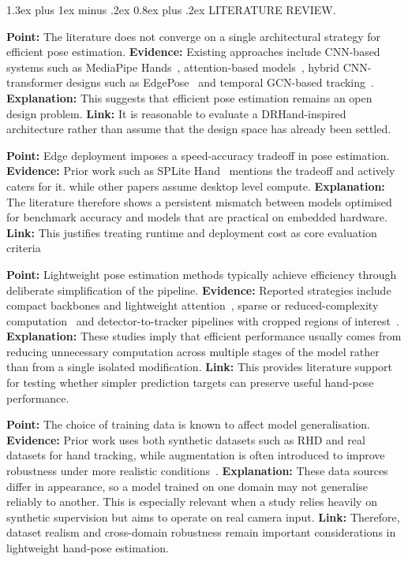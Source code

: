 \documentclass[10pt,letterpaper]{article}
\makeatletter
\renewcommand\section{\@startsection{section}{1}{\z@}%
  {1.3ex plus 1ex minus .2ex}%
  {0.8ex plus .2ex}%
  {\centering\normalfont\small\scshape}}
\makeatother
\begin{document}
\section{LITERATURE REVIEW}.

\medskip
\noindent\textbf{Point:} The literature does not converge on a single architectural strategy for efficient pose estimation.  
\textbf{Evidence:} Existing approaches include CNN-based systems such as MediaPipe Hands~\cite{mediapipe}, attention-based models~\cite{attentionlite}, hybrid CNN-transformer designs such as EdgePose~\cite{edgepose} and temporal GCN-based tracking~\cite{handobjectgcn}.  
\textbf{Explanation:} This suggests that efficient pose estimation remains an open design problem.  
\textbf{Link:} It is reasonable to evaluate a DRHand-inspired architecture rather than assume that the design space has already been settled.

\medskip
\noindent\textbf{Point:} Edge deployment imposes a speed-accuracy tradeoff in pose estimation.  
\textbf{Evidence:} Prior work such as SPLite Hand~\cite{splitehand} mentions the tradeoff and actively caters for it. while other papers assume desktop level compute.
\textbf{Explanation:} The literature therefore shows a persistent mismatch between models optimised for benchmark accuracy and models that are practical on embedded hardware.  
\textbf{Link:} This justifies treating runtime and deployment cost as core evaluation criteria

\medskip
\noindent\textbf{Point:} Lightweight pose estimation methods typically achieve efficiency through deliberate simplification of the pipeline.  
\textbf{Evidence:} Reported strategies include compact backbones and lightweight attention~\cite{attentionlite}, sparse or reduced-complexity computation~\cite{splitehand} and detector-to-tracker pipelines with cropped regions of interest~\cite{mediapipe}.  
\textbf{Explanation:} These studies imply that efficient performance usually comes from reducing unnecessary computation across multiple stages of the model rather than from a single isolated modification.  
\textbf{Link:} This provides literature support for testing whether simpler prediction targets can preserve useful hand-pose performance.

\medskip
\noindent\textbf{Point:} The choice of training data is known to affect model generalisation.  
\textbf{Evidence:} Prior work uses both synthetic datasets such as RHD and real datasets for hand tracking, while augmentation is often introduced to improve robustness under more realistic conditions~\cite{handobjectgcn,lightweightgcnhand,handaugment}.  
\textbf{Explanation:} These data sources differ in appearance, so a model trained on one domain may not generalise reliably to another. This is especially relevant when a study relies heavily on synthetic supervision but aims to operate on real camera input.  
\textbf{Link:} Therefore, dataset realism and cross-domain robustness remain important considerations in lightweight hand-pose estimation.
\end{document}
